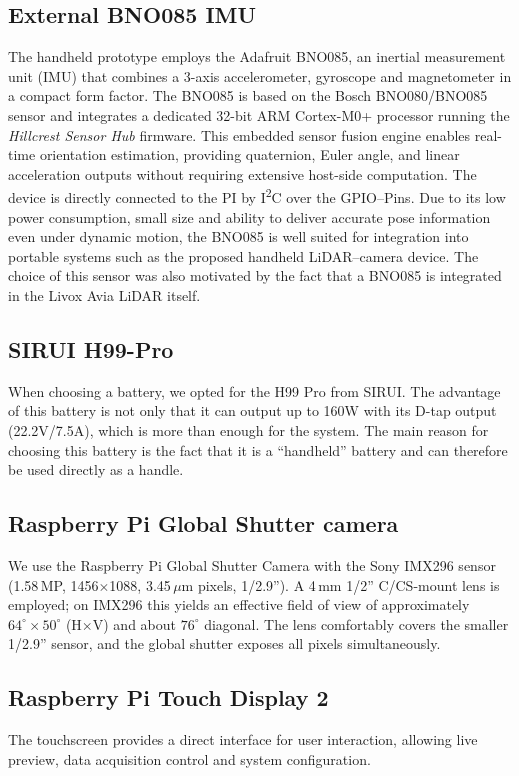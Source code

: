 \documentclass[english, bachelor, utf8]{base/thesis_telematics}
\begin{document}
\subsection*{External BNO085 IMU}
The handheld prototype employs the Adafruit BNO085, an inertial measurement unit (IMU) that combines 
a 3-axis accelerometer, gyroscope and magnetometer in a compact form factor. The BNO085 is based on 
the Bosch BNO080/BNO085 sensor and integrates a dedicated 32-bit ARM Cortex-M0+ processor running 
the \textit{Hillcrest Sensor Hub} firmware. This embedded sensor fusion engine enables real-time 
orientation estimation, providing quaternion, Euler angle, and linear acceleration outputs without 
requiring extensive host-side computation.
The device is directly connected to the PI by I\textsuperscript{2}C over the GPIO--Pins.
Due to its low power consumption, small size and ability to deliver accurate 
pose information even under dynamic motion, the BNO085 is well suited for integration into portable 
systems such as the proposed handheld LiDAR--camera device.
The choice of this sensor was also motivated by the fact that a BNO085 is integrated in the Livox 
Avia LiDAR itself.\cite{AdafruitBNO085}


\subsection*{SIRUI H99-Pro}
    When choosing a battery, we opted for the H99 Pro from SIRUI. 
    The advantage of this battery is not only that it can output up to 160W with its D-tap output (22.2V/7.5A), 
    which is more than enough for the system.
    The main reason for choosing this battery is the fact that it is a “handheld” battery and can therefore 
    be used directly as a handle.

\subsection*{Raspberry Pi Global Shutter camera}
We use the Raspberry Pi Global Shutter Camera with the Sony IMX296 sensor
(1.58\,MP, 1456$\times$1088, 3.45\,$\mu$m pixels, 1/2.9''). A 4\,mm 1/2''
C/CS-mount lens is employed; on IMX296 this yields an effective field of view
of approximately $64^\circ \times 50^\circ$ (H$\times$V) and about $76^\circ$
diagonal. The lens comfortably covers the smaller 1/2.9'' sensor, and the
global shutter exposes all pixels simultaneously.

\subsection*{Raspberry Pi Touch Display 2}
The touchscreen provides a direct interface for user interaction,  
allowing live preview, data acquisition control and system configuration.
\end{document}
